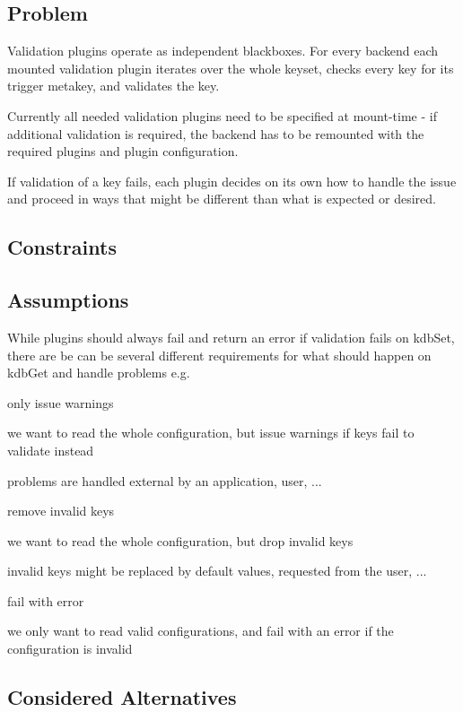 \subsection*{Problem}

Validation plugins operate as independent blackboxes. For every backend each mounted validation plugin iterates over the whole keyset, checks every key for its trigger metakey, and validates the key.

Currently all needed validation plugins need to be specified at mount-\/time -\/ if additional validation is required, the backend has to be remounted with the required plugins and plugin configuration.

If validation of a key fails, each plugin decides on its own how to handle the issue and proceed in ways that might be different than what is expected or desired.

\subsection*{Constraints}

\subsection*{Assumptions}

While plugins should always fail and return an error if validation fails on kdb\+Set, there are be can be several different requirements for what should happen on kdb\+Get and handle problems e.\+g.


\begin{DoxyItemize}
\item only issue warnings

we want to read the whole configuration, but issue warnings if keys fail to validate instead

problems are handled external by an application, user, ...
\item remove invalid keys

we want to read the whole configuration, but drop invalid keys

invalid keys might be replaced by default values, requested from the user, ...
\item fail with error

we only want to read valid configurations, and fail with an error if the configuration is invalid
\end{DoxyItemize}

\subsection*{Considered Alternatives}


